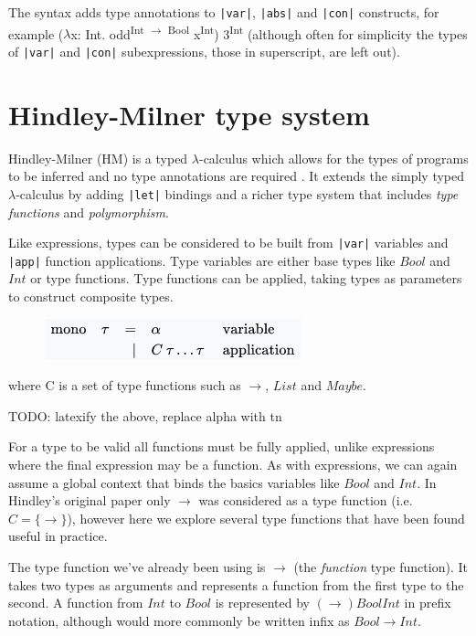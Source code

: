 \documentclass[a4paper,fleqn,twoside,12pt]{report}
\begin{document}
The syntax adds type annotations to \texttt{|var|}, \texttt{|abs|} and \texttt{|con|} constructs, for example ($\lambda$x: Int. odd\textsuperscript{Int $\rightarrow$ Bool} x\textsuperscript{Int}) 3\textsuperscript{Int} (although often for simplicity the types of \texttt{|var|} and \texttt{|con|} subexpressions, those in superscript, are left out).

\section{Hindley-Milner type system}\label{id:h.gsouq2axz3k}
Hindley-Milner (HM) is a typed $\lambda$-calculus which allows for the types of programs to be inferred and no type annotations are required \citep{ref12,ref13}. It extends the simply typed $\lambda$-calculus by adding \texttt{|let|} bindings and a richer type system that includes \textit{type functions} and \textit{polymorphism}.

Like expressions, types can be considered to be built from \texttt{|var|} variables and \texttt{|app|} function applications. Type variables are either base types like $Bool$ and $Int$ or type functions. Type functions can be applied, taking types as parameters to construct composite types.

\begin{figure}[h!]
  \centering
  \includegraphics[width=0.467\linewidth]{images/image17.png}
\end{figure}
where C is a set of type functions such as $\rightarrow$, $List$ and $Maybe$.

TODO: latexify the above, replace alpha with tn

For a type to be valid all functions must be fully applied, unlike expressions where the final expression may be a function. As with expressions, we can again assume a global context that binds the basics variables like $Bool$ and $Int$. In Hindley’s original paper only $\rightarrow$ was considered as a type function (i.e. $C = \{ \rightarrow \}$), however here we explore several type functions that have been found useful in practice.

The type function we’ve already been using is $\rightarrow$ (the \textit{function} type function). It takes two types as arguments and represents a function from the first type to the second. A function from $Int$ to $Bool$ is represented by $(\rightarrow) Bool Int$ in prefix notation, although would more commonly be written infix as $Bool \rightarrow Int$.
\end{document}
